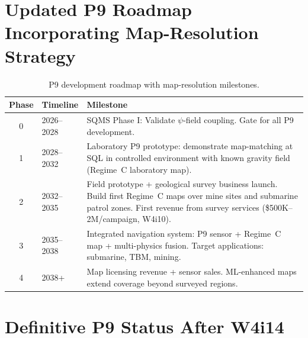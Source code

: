 \documentclass[11pt]{article}
\theoremstyle{definition}
\theoremstyle{remark}
\begin{document}
\section{Updated P9 Roadmap Incorporating Map-Resolution Strategy}
\label{sec:roadmap}

\begin{table}[H]
\centering
\caption{P9 development roadmap with map-resolution milestones.}
\label{tab:roadmap}
\begin{tabular}{@{}clp{6.5cm}@{}}
\toprule
Phase & Timeline & Milestone \\
\midrule
0 & 2026--2028 & SQMS Phase I: Validate $\psi$-field coupling. Gate for all P9 development. \\
1 & 2028--2032 & Laboratory P9 prototype: demonstrate map-matching at SQL in controlled
  environment with known gravity field (Regime~C laboratory map). \\
2 & 2032--2035 & Field prototype + geological survey business launch.
  Build first Regime~C maps over mine sites and submarine patrol zones.
  First revenue from survey services (\$500K--2M/campaign, W4i10). \\
3 & 2035--2038 & Integrated navigation system: P9 sensor + Regime~C map +
  multi-physics fusion. Target applications: submarine, TBM, mining. \\
4 & 2038+ & Map licensing revenue + sensor sales. ML-enhanced maps
  extend coverage beyond surveyed regions. \\
\bottomrule
\end{tabular}
\end{table}

\section{Definitive P9 Status After W4i14}
\label{sec:status-w4i14}
\end{document}
